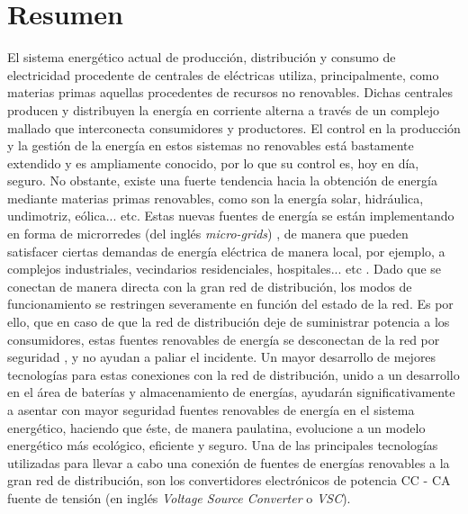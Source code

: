 \documentclass{report}
\begin{document}
\newpage
{}
\setcounter{page}{1}

\chapter*{Resumen} \label{sec.resumen}
El sistema energético actual de producción, distribución y consumo de electricidad procedente de centrales de eléctricas utiliza, principalmente, como materias primas aquellas procedentes de recursos no renovables. Dichas centrales producen y distribuyen la energía en corriente alterna a través de un complejo mallado que interconecta consumidores y productores. El control en la producción y la gestión de la energía en estos sistemas no renovables está bastamente extendido y es ampliamente conocido, por lo que su control es, hoy en día, seguro. No obstante, existe una fuerte tendencia hacia la obtención de energía mediante materias primas renovables, como son la energía solar, hidráulica, undimotriz, eólica... etc. Estas nuevas fuentes de energía se están implementando en forma de microrredes (del inglés \textit{micro-grids}) \cite{veinticinco}, de manera que pueden satisfacer ciertas demandas de energía eléctrica de manera local, por ejemplo, a complejos industriales, vecindarios residenciales, hospitales... etc \cite{veintidos}. Dado que se conectan de manera directa con la gran red de distribución, los modos de funcionamiento se restringen severamente en función del estado de la red. Es por ello, que en caso de que la red de distribución deje de suministrar potencia a los consumidores, estas fuentes renovables de energía se desconectan de la red por seguridad \cite{veintitres}, y no ayudan a paliar el incidente. 
Un mayor desarrollo de mejores tecnologías para estas conexiones con la red de distribución, unido a un desarrollo en el área de baterías y almacenamiento de energías, ayudarán significativamente a asentar con mayor seguridad fuentes renovables de energía en el sistema energético, haciendo que éste, de manera paulatina, evolucione a un modelo energético más ecológico, eficiente y seguro. 
Una de las principales tecnologías utilizadas para llevar a cabo una conexión de fuentes de energías renovables a la gran red de distribución, son los convertidores electrónicos de potencia CC - CA fuente de tensión (en inglés \textit{Voltage Source Converter} o \textit{VSC}). 
\end{document}
